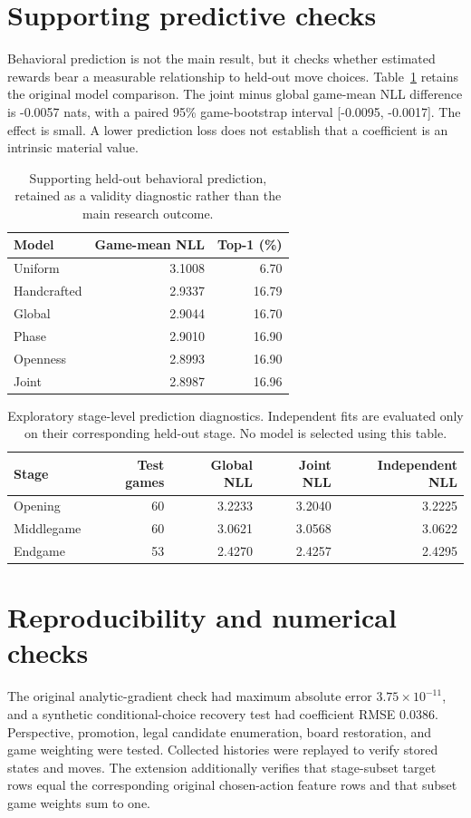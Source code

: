 \documentclass[11pt]{article}
\begin{document}
\appendix
\section{Supporting predictive checks}
Behavioral prediction is not the main result, but it checks whether estimated rewards bear a measurable relationship to held-out move choices. Table~\ref{tab:performance} retains the original model comparison. The joint minus global game-mean NLL difference is -0.0057 nats, with a paired 95\% game-bootstrap interval [-0.0095, -0.0017]. The effect is small. A lower prediction loss does not establish that a coefficient is an intrinsic material value.
\begin{table}[htbp]\centering
\small
\caption{Supporting held-out behavioral prediction, retained as a validity diagnostic rather than the main research outcome.}\label{tab:performance}
\begin{tabular}{lrr}
\toprule
Model & Game-mean NLL & Top-1 (\%)\\\midrule
Uniform & 3.1008 & 6.70\\
Handcrafted & 2.9337 & 16.79\\
Global & 2.9044 & 16.70\\
Phase & 2.9010 & 16.90\\
Openness & 2.8993 & 16.90\\
Joint & 2.8987 & 16.96\\
\bottomrule\end{tabular}\end{table}
\begin{table}[htbp]\centering
\small
\caption{Exploratory stage-level prediction diagnostics. Independent fits are evaluated only on their corresponding held-out stage. No model is selected using this table.}\label{tab:stageperf}
\begin{tabular}{lrrrr}
\toprule
Stage & Test games & Global NLL & Joint NLL & Independent NLL\\\midrule
Opening & 60 & 3.2233 & 3.2040 & 3.2225\\
Middlegame & 60 & 3.0621 & 3.0568 & 3.0622\\
Endgame & 53 & 2.4270 & 2.4257 & 2.4295\\
\bottomrule\end{tabular}\end{table}

\FloatBarrier
\section{Reproducibility and numerical checks}
The original analytic-gradient check had maximum absolute error $3.75\times10^{-11}$, and a synthetic conditional-choice recovery test had coefficient RMSE 0.0386. Perspective, promotion, legal candidate enumeration, board restoration, and game weighting were tested. Collected histories were replayed to verify stored states and moves. The extension additionally verifies that stage-subset target rows equal the corresponding original chosen-action feature rows and that subset game weights sum to one.
\end{document}
